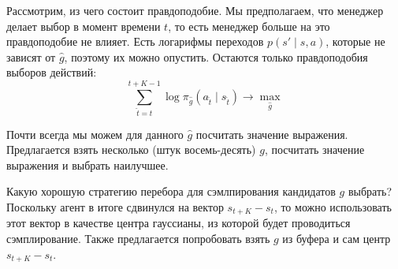 Рассмотрим, из чего состоит правдоподобие. Мы предполагаем, что менеджер делает выбор в момент времени $t$, то есть менеджер больше на это правдоподобие не влияет. Есть логарифмы переходов $p(s' \mid s, a)$, которые не зависят от $\hat{g}$, поэтому их можно опустить. Остаются только правдоподобия выборов действий:
$$\sum_{\hat{t} = t}^{t + K - 1} \log \pi_{\hat{g}}(a_{\hat{t}} \mid s_{\hat{t}}) \to \max_{\hat{g}}$$

Почти всегда мы можем для данного $\hat{g}$ посчитать значение выражения. Предлагается взять несколько (штук восемь-десять) $g$, посчитать значение выражения и выбрать наилучшее. 

Какую хорошую стратегию перебора для сэмлпирования кандидатов $g$ выбрать? Поскольку агент в итоге сдвинулся на вектор $s_{t + K} - s_t$, то можно использовать этот вектор в качестве центра гауссианы, из которой будет проводиться сэмплирование. Также предлагается попробовать взять $g$ из буфера и сам центр $s_{t + K} - s_t$.